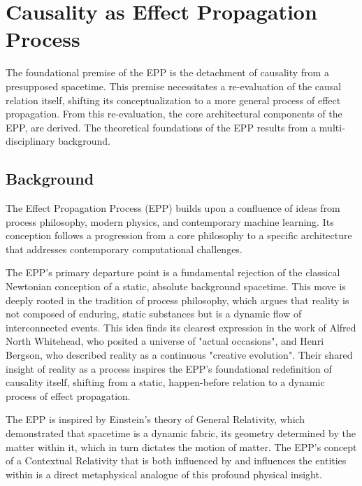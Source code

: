 \section{Causality as Effect Propagation Process}
\label{sec:epp}

The foundational premise of the EPP is the detachment of causality from a presupposed spacetime. This premise necessitates a re-evaluation of the causal relation itself, shifting its conceptualization to a more general process of effect propagation. From this re-evaluation, the core architectural components of the EPP, are derived. The theoretical foundations of the EPP results from a multi-disciplinary background. 

%
%
\subsection{Background}
\label{sec:epp_background}

The Effect Propagation Process (EPP) builds upon a confluence of ideas from process philosophy, modern physics, and contemporary machine learning. Its conception follows a progression from a core philosophy to a specific architecture that addresses contemporary computational challenges.

The EPP's primary departure point is a fundamental rejection of the classical Newtonian conception of a static, absolute background spacetime. This move is deeply rooted in the tradition of process philosophy, which argues that reality is not composed of enduring, static substances but is a dynamic flow of interconnected events. This idea finds its clearest expression in the work of Alfred North Whitehead, who posited a universe of "actual occasions"\cite{whitehead2010process}, and Henri Bergson, who described reality as a continuous "creative evolution"\cite{bergson2022creative}. Their shared insight of reality as a process inspires the EPP's foundational redefinition of causality itself, shifting from a static, happen-before relation to a dynamic process of effect propagation.

The EPP is inspired by Einstein's theory of General Relativity\cite{EinsteinPapers1915}, which demonstrated that spacetime is a dynamic fabric, its geometry determined by the matter within it, which in turn dictates the motion of matter. The EPP's concept of a Contextual Relativity that is both influenced by and influences the entities within is a direct metaphysical analogue of this profound physical insight. 

